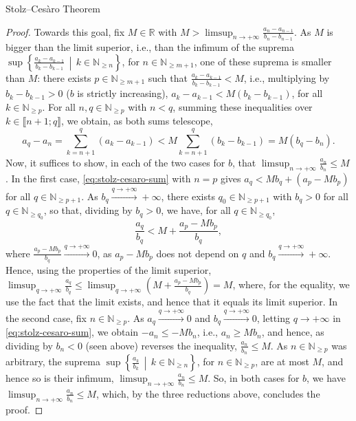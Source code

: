 \begin{appendixitem}{Stolz–Cesàro Theorem}
\begin{proof}
        Towards this goal, fix \( M \in \mathbb{R} \) with \( M > \limsup_{n \to +\infty} \frac{a_n-a_{n-1}}{b_n-b_{n-1}} \). As \( M \) is bigger than the limit superior, i.e., than the infimum of the suprema \( \sup\left\{ \frac{a_k-a_{k-1}}{b_k-b_{k-1}} \,\middle|\, k \in \mathbb{N}_{\geq n} \right\} \), for \( n \in \mathbb{N}_{\geq m+1} \), one of these suprema is smaller than \( M \): there exists \( p \in \mathbb{N}_{\geq m+1} \) such that \( \frac{a_k-a_{k-1}}{b_k-b_{k-1}} < M \), i.e., multiplying by \( b_k-b_{k-1} > 0 \) (\( b \) is strictly increasing), \( a_k-a_{k-1} < M\left(b_k-b_{k-1}\right) \), for all \( k \in \mathbb{N}_{\geq p} \). For all \( n, q \in \mathbb{N}_{\geq p} \) with \( n < q \), summing these inequalities over \( k \in \llbracket n+1;q \rrbracket \), we obtain, as both sums telescope,
        \begin{equation}
            a_q-a_n = \sum_{k=n+1}^{q} \left(a_k-a_{k-1}\right) < M\sum_{k=n+1}^{q} \left(b_k-b_{k-1}\right) = M\left(b_q-b_n\right). \label{eq:stolz-cesaro-sum}
        \end{equation}
        Now, it suffices to show, in each of the two cases for \( b \), that \( \limsup_{n \to +\infty} \frac{a_n}{b_n} \leq M \). In the first case, \eqref{eq:stolz-cesaro-sum} with \( n = p \) gives \( a_q < M b_q+\left(a_p-M b_p\right) \) for all \( q \in \mathbb{N}_{\geq p+1} \). As \( b_q \overset{q \to +\infty}{\longrightarrow} +\infty \), there exists \( q_0 \in \mathbb{N}_{\geq p+1} \) with \( b_q > 0 \) for all \( q \in \mathbb{N}_{\geq q_0} \), so that, dividing by \( b_q > 0 \), we have, for all \( q \in \mathbb{N}_{\geq q_0} \),
        \[
            \frac{a_q}{b_q} < M+\frac{a_p-M b_p}{b_q},
        \]
        where \( \frac{a_p-M b_p}{b_q} \overset{q \to +\infty}{\longrightarrow} 0 \), as \( a_p-M b_p \) does not depend on \( q \) and \( b_q \overset{q \to +\infty}{\longrightarrow} +\infty \). Hence, using the properties of the limit superior, \( \limsup_{q \to +\infty} \frac{a_q}{b_q} \leq \limsup_{q \to +\infty} \left(M+\frac{a_p-M b_p}{b_q}\right) = M \), where, for the equality, we use the fact that the limit exists, and hence that it equals its limit superior. In the second case, fix \( n \in \mathbb{N}_{\geq p} \). As \( a_q \overset{q \to +\infty}{\longrightarrow} 0 \) and \( b_q \overset{q \to +\infty}{\longrightarrow} 0 \), letting \( q \to +\infty \) in \eqref{eq:stolz-cesaro-sum}, we obtain \( -a_n \leq -M b_n \), i.e., \( a_n \geq M b_n \), and hence, as dividing by \( b_n < 0 \) (seen above) reverses the inequality, \( \frac{a_n}{b_n} \leq M \). As \( n \in \mathbb{N}_{\geq p} \) was arbitrary, the suprema \( \sup\left\{ \frac{a_k}{b_k} \,\middle|\, k \in \mathbb{N}_{\geq n} \right\} \), for \( n \in \mathbb{N}_{\geq p} \), are at most \( M \), and hence so is their infimum, \( \limsup_{n \to +\infty} \frac{a_n}{b_n}\leq M \). So, in both cases for \( b \), we have \( \limsup_{n \to +\infty} \frac{a_n}{b_n} \leq M \), which, by the three reductions above, concludes the proof.

\end{proof}
\end{appendixitem}
